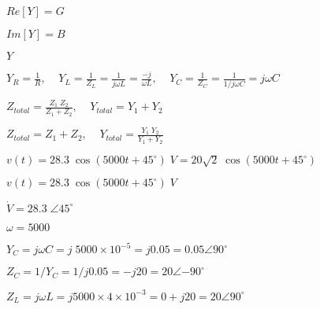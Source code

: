 \documentclass{article}
\def\lthtmlcheckvsize{\ifdim\ht\sizebox<\vsize 
  \ifdim\wd\sizebox<\hsize\expandafter\hfill\fi \expandafter\vfill
  \else\expandafter\vss\fi}%
\begin{document}
{\newpage\clearpage
{}%
$ Re[Y]=G$%
\lthtmlindisplaymathZ
\lthtmlcheckvsize\clearpage}

{\newpage\clearpage
{}%
$ Im[Y]=B$%
\lthtmlindisplaymathZ
\lthtmlcheckvsize\clearpage}

{\newpage\clearpage
{}%
$ Y$%
\lthtmlindisplaymathZ
\lthtmlcheckvsize\clearpage}

{\newpage\clearpage
{}%
$\displaystyle Y_R=\frac{1}{R},\;\;\;\;
Y_L=\frac{1}{Z_L}=\frac{1}{j\omega L}=\frac{-j}{\omega L},\;\;\;\;
Y_C=\frac{1}{Z_C}=\frac{1}{1/j\omega C}=j\omega C$%
\lthtmlindisplaymathZ
\lthtmlcheckvsize\clearpage}

{\newpage\clearpage
{}%
$\displaystyle Z_{total}=\frac{Z_1\;Z_2}{Z_1+Z_2},\;\;\;\;Y_{total}=Y_1+Y_2$%
\lthtmlindisplaymathZ
\lthtmlcheckvsize\clearpage}

{\newpage\clearpage
{}%
$\displaystyle Z_{total}=Z_1+Z_2,\;\;\;\;Y_{total}=\frac{Y_1\;Y_2}{Y_1+Y_2}$%
\lthtmlindisplaymathZ
\lthtmlcheckvsize\clearpage}

{\newpage\clearpage
{}%
$ v(t)=28.3\;\cos(5000t+45^\circ)\;V=20\sqrt{2}\;\cos(5000t+45^\circ)$%
\lthtmlindisplaymathZ
\lthtmlcheckvsize\clearpage}

{\newpage\clearpage
{}%
$ v(t)=28.3\;\cos(5000t+45^\circ)\;V$%
\lthtmlindisplaymathZ
\lthtmlcheckvsize\clearpage}

{\newpage\clearpage
{}%
$ \dot{V}=28.3\;\angle{45^\circ}$%
\lthtmlindisplaymathZ
\lthtmlcheckvsize\clearpage}

{\newpage\clearpage
{}%
$ \omega=5000$%
\lthtmlindisplaymathZ
\lthtmlcheckvsize\clearpage}

{\newpage\clearpage
{}%
$ Y_C=j\omega C=j\;5000\times 10^{-5}=j0.05=0.05\angle{90^\circ}$%
\lthtmlindisplaymathZ
\lthtmlcheckvsize\clearpage}

{\newpage\clearpage
{}%
$ Z_C=1/Y_C=1/j0.05=-j20=20\angle{-90^\circ}$%
\lthtmlindisplaymathZ
\lthtmlcheckvsize\clearpage}

{\newpage\clearpage
{}%
$ Z_L=j\omega L=j5000\times 4\times 10^{-3}=0+j20=20\angle{90^\circ}$%
\lthtmlindisplaymathZ
\lthtmlcheckvsize\clearpage}
\end{document}
